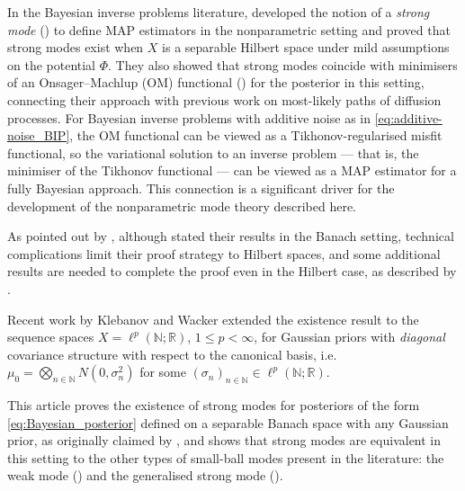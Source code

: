 \documentclass[11pt]{article}
\newcommand*{\defterm}{\emph}%
\newcommand*{\Naturals}{\mathbb{N}}
\newcommand*{\Reals}{\mathbb{R}}
\renewcommand*{\leq}{\leqslant}
\theoremstyle{plain}
\theoremstyle{definition}
\numberwithin{equation}{section}
\numberwithin{figure}{section}
\numberwithin{table}{section}
\begin{document}
In the Bayesian inverse problems literature, \citet{DashtiLawStuartVoss2013} developed the notion of a \defterm{strong mode} () to define MAP estimators in the nonparametric setting and proved that strong modes exist when $X$ is a separable Hilbert space under mild assumptions on the potential $\Phi$.
They also showed that strong modes coincide with minimisers of an Onsager--Machlup (OM) functional () for the posterior in this setting, connecting their approach with previous work on most-likely paths of diffusion processes. 
For Bayesian inverse problems with additive noise as in \eqref{eq:additive-noise_BIP}, the OM functional can be viewed as a Tikhonov-regularised misfit functional, so the variational solution to an inverse problem --- that is, the minimiser of the Tikhonov functional --- can be viewed as a MAP estimator for a fully Bayesian approach.
This connection is a significant driver for the development of the nonparametric mode theory described here.

As pointed out by \citet{KlebanovWacker2022}, although \citet{DashtiLawStuartVoss2013} stated their results in the Banach setting, technical complications limit their proof strategy to Hilbert spaces, and some additional results are needed to complete the proof even in the Hilbert case, as described by \citet{Kretschmann2019}.

Recent work by Klebanov and Wacker extended the existence result to the sequence spaces $X = \ell^p(\Naturals; \Reals)$, $1 \leq p < \infty$, for Gaussian priors with \emph{diagonal} covariance structure with respect to the canonical basis, i.e.\ $\mu_0 = \bigotimes_{n \in \Naturals} N(0, \sigma_n^{2})$ for some $(\sigma_n)_{n \in \Naturals} \in \ell^{p}(\Naturals; \Reals)$.

This article proves the existence of strong modes for posteriors of the form \eqref{eq:Bayesian_posterior} defined on a separable Banach space with any Gaussian prior, as originally claimed by \citet[Theorem~3.5]{DashtiLawStuartVoss2013}, and shows that strong modes are equivalent in this setting to the other types of small-ball modes present in the literature: the weak mode () and the generalised strong mode ().
\end{document}
